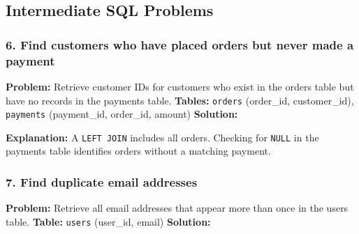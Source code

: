 \subsection{Intermediate SQL Problems}\label{intermediate-sql-problems}

\subsubsection{6. Find customers who have placed orders but never made a
payment}\label{find-customers-who-have-placed-orders-but-never-made-a-payment}

\textbf{Problem:} Retrieve customer IDs for customers who exist in the
orders table but have no records in the payments table. \textbf{Tables:}
\texttt{orders} (order\_id, customer\_id), \texttt{payments}
(payment\_id, order\_id, amount) \textbf{Solution:}

\begin{Shaded}
\begin{Highlighting}[]
 
 \OperatorTok{=}
 \NormalTok{;}
\end{Highlighting}
\end{Shaded}

\textbf{Explanation:} A \texttt{LEFT\ JOIN} includes all orders.
Checking for \texttt{NULL} in the payments table identifies orders
without a matching payment.

\subsubsection{7. Find duplicate email
addresses}\label{find-duplicate-email-addresses}

\textbf{Problem:} Retrieve all email addresses that appear more than
once in the users table. \textbf{Table:} \texttt{users} (user\_id,
email) \textbf{Solution:}

\begin{Shaded}
\begin{Highlighting}[]
 
 \OperatorTok{\textgreater{}} \NormalTok{;}
\end{Highlighting}
\end{Shaded}

